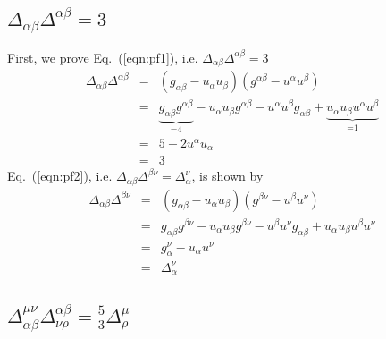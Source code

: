 \documentclass[aps,article]{revtex4}
\begin{document}
\subsection{$\Delta_{\alpha\beta}\Delta^{\alpha\beta}=3$}
First, we prove Eq.\ (\ref{eqn:pf1}), i.e. $\Delta_{\alpha\beta}\Delta^{\alpha\beta}=3$
\begin{eqnarray}
\Delta_{\alpha\beta}\Delta^{\alpha\beta}&=&\left(g_{\alpha\beta}-u_{\alpha}u_{\beta}\right)\left(g^{\alpha\beta}-u^{\alpha}u^{\beta}\right)\nonumber\\
&=&\underbrace{g_{\alpha\beta}g^{\alpha\beta}}_\textrm{=4}-u_{\alpha}u_{\beta}g^{\alpha\beta}-u^{\alpha}u^{\beta}g_{\alpha\beta}+\underbrace{u_{\alpha}u_{\beta}u^{\alpha}u^{\beta}}_\textrm{=1}\nonumber\\
&=&5-2u^{\alpha}u_{\alpha}\nonumber\\
&=&3															
\end{eqnarray}
Eq.\ (\ref{eqn:pf2}), i.e. $\Delta_{\alpha\beta}\Delta^{\beta\nu}=\Delta_{\alpha}^{\nu}$, is shown by
\begin{eqnarray}
\Delta_{\alpha\beta}\Delta^{\beta\nu}&=&\left(g_{\alpha\beta}-u_{\alpha}u_{\beta}\right)\left(g^{\beta\nu}-u^{\beta}u^{\nu}\right)\nonumber\\
&=&g_{\alpha\beta}g^{\beta\nu}-u_{\alpha}u_{\beta}g^{\beta\nu}-u^{\beta}u^{\nu}g_{\alpha\beta}+u_{\alpha}u_{\beta}u^{\beta}u^{\nu}\nonumber\\	
&=&g_{\alpha}^{\nu}-u_{\alpha}u^{\nu}\nonumber\\	
&=&\Delta_{\alpha}^{\nu}													
\end{eqnarray}

\subsection{$\Delta^{\mu\nu}_{\alpha\beta}\Delta_{\nu\rho}^{\alpha\beta}=\frac{5}{3}\Delta^{\mu}_{\rho}$}
\end{document}
